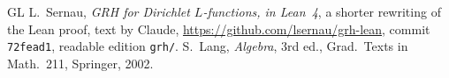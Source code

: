 \documentclass[reqno]{amsart}
\theoremstyle{definition}
\theoremstyle{plain}
\theoremstyle{definition}
\begin{document}
\begin{thebibliography}{GL}
 L.~Sernau, \emph{GRH for Dirichlet \(L\)-functions, in Lean~4}, a shorter rewriting of the Lean proof, text by Claude, \url{https://github.com/lsernau/grh-lean}, commit \texttt{72fead1}, readable edition \texttt{grh/}.
 S.~Lang, \emph{Algebra}, 3rd ed., Grad.\ Texts in Math.\ 211, Springer, 2002.
\end{thebibliography}
\end{document}
